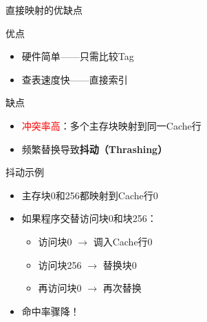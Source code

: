 \documentclass[10pt, aspectratio=169]{beamer}
\begin{document}
\begin{frame}[t]{直接映射的优缺点}
    \begin{block}{优点}
        \begin{itemize}
            \item 硬件简单——只需比较Tag
            \item 查表速度快——直接索引
        \end{itemize}
    \end{block}
    \vspace{0.3em}
    \begin{block}{缺点}
        \begin{itemize}
            \item \textcolor{red}{冲突率高}：多个主存块映射到同一Cache行
            \item 频繁替换导致\textbf{抖动（Thrashing）}
        \end{itemize}
    \end{block}
    \vspace{0.3em}
    \begin{exampleblock}{抖动示例}
        \begin{itemize}
            \item 主存块0和256都映射到Cache行0
            \item 如果程序交替访问块0和块256：
            \begin{itemize}
                \item 访问块0 $\to$ 调入Cache行0
                \item 访问块256 $\to$ 替换块0
                \item 再访问块0 $\to$ 再次替换
            \end{itemize}
            \item 命中率骤降！
        \end{itemize}
    \end{exampleblock}
\end{frame}
\end{document}
